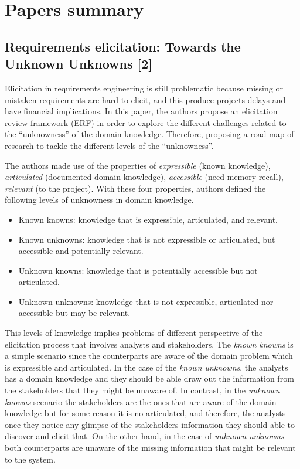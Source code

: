 \documentclass[]{llncs}
\begin{document}
\hypertarget{papers-summary}{%
\section{Papers summary}\label{papers-summary}}

\hypertarget{requirements-elicitation-towards-the-unknown-unknowns-sutcliffe2013requirements}{%
\subsection{Requirements elicitation: Towards the Unknown Unknowns
{[}2{]}}\label{requirements-elicitation-towards-the-unknown-unknowns-sutcliffe2013requirements}}

Elicitation in requirements engineering is still problematic because
missing or mistaken requirements are hard to elicit, and this produce
projects delays and have financial implications. In this paper, the
authors propose an elicitation review framework (ERF) in order to
explore the different challenges related to the ``unknowness'' of the
domain knowledge. Therefore, proposing a road map of research to tackle
the different levels of the ``unknowness''.

The authors made use of the properties of \emph{expressible} (known
knowledge), \emph{articulated} (documented domain knowledge),
\emph{accessible} (need memory recall), \emph{relevant} (to the
project). With these four properties, authors defined the following
levels of unknowness in domain knowledge.

\begin{itemize}
\tightlist
\item
  Known knowns: knowledge that is expressible, articulated, and
  relevant.
\item
  Known unknowns: knowledge that is not expressible or articulated, but
  accessible and potentially relevant.
\item
  Unknown knowns: knowledge that is potentially accessible but not
  articulated.
\item
  Unknown unknowns: knowledge that is not expressible, articulated nor
  accessible but may be relevant.
\end{itemize}

This levels of knowledge implies problems of different perspective of
the elicitation process that involves analysts and stakeholders. The
\emph{known knowns} is a simple scenario since the counterparts are
aware of the domain problem which is expressible and articulated. In the
case of the \emph{known unknowns}, the analysts has a domain knowledge
and they should be able draw out the information from the stakeholders
that they might be unaware of. In contrast, in the \emph{unknown knowns}
scenario the stakeholders are the ones that are aware of the domain
knowledge but for some reason it is no articulated, and therefore, the
analysts once they notice any glimpse of the stakeholders information
they should able to discover and elicit that. On the other hand, in the
case of \emph{unknown unknowns} both counterparts are unaware of the
missing information that might be relevant to the system.
\end{document}
